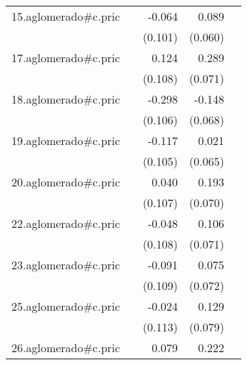 {\begin{longtable}{l*{4}{D{.}{.}{-1}}}
\addlinespace
15.aglomerado#c.pric&                     &      -0.064         &       0.089         &                     \\
            &                     &     (0.101)         &     (0.060)         &                     \\
\addlinespace
17.aglomerado#c.pric&                     &       0.124         &       0.289\sym{***}&                     \\
            &                     &     (0.108)         &     (0.071)         &                     \\
\addlinespace
18.aglomerado#c.pric&                     &      -0.298\sym{**} &      -0.148\sym{*}  &                     \\
            &                     &     (0.106)         &     (0.068)         &                     \\
\addlinespace
19.aglomerado#c.pric&                     &      -0.117         &       0.021         &                     \\
            &                     &     (0.105)         &     (0.065)         &                     \\
\addlinespace
20.aglomerado#c.pric&                     &       0.040         &       0.193\sym{**} &                     \\
            &                     &     (0.107)         &     (0.070)         &                     \\
\addlinespace
22.aglomerado#c.pric&                     &      -0.048         &       0.106         &                     \\
            &                     &     (0.108)         &     (0.071)         &                     \\
\addlinespace
23.aglomerado#c.pric&                     &      -0.091         &       0.075         &                     \\
            &                     &     (0.109)         &     (0.072)         &                     \\
\addlinespace
25.aglomerado#c.pric&                     &      -0.024         &       0.129         &                     \\
            &                     &     (0.113)         &     (0.079)         &                     \\
\addlinespace
26.aglomerado#c.pric&                     &       0.079         &       0.222\sym{**} &                     \\

\end{longtable}}

